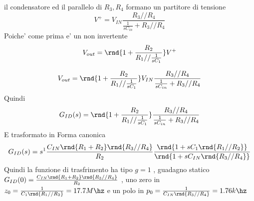 \documentclass[\main/main.tex]{subfiles}
\begin{document}
il condensatore ed il parallelo di $R_3,R_4$ formano un partitore di tensione
\[V^+ = V_{IN} \frac{R_3 // R_4}{\frac{1}{sC_{in}} + R_3 // R_4}\]
Poiche' come prima e' un non invertente
\[V_{out} = \rnd{1 + \frac{R_2}{R_1 // \frac{1}{sC_1}}}V^+\]

\[V_{out} = \rnd{1 + \frac{R_2}{R_1 // \frac{1}{sC_1}}}V_{IN} \frac{R_3 // R_4}{\frac{1}{sC_{in}} + R_3 // R_4}\]
Quindi
\[G_{ID}(s) =  \rnd{1 + \frac{R_2}{R_1 // \frac{1}{sC_1}}} \frac{R_3 // R_4}{\frac{1}{sC_{in}} + R_3 // R_4}\]
E trasformato in Forma canonica
\[G_{ID}(s) = s^1 \frac{C_{IN}\rnd{R_1 + R_2}\rnd{R_3 // R_4}}{R_2} \frac{\rnd{1 + s C_1 \rnd{R_1 // R_2}}}{\rnd{1 + s C_{IN}\rnd{R_3 // R_4}}}\]
Quindi la funzione di trasfrimento ha tipo $g = 1$ , guadagno statico $G_{ID}(0) = \frac{C_{IN}\rnd{R_1 + R_2}\rnd{R_3 // R_4}}{R_2}$ , uno zero in $z_0 = \frac{1}{ C_1 \rnd{R_1 // R_2}} = 17.7M\hz$ e un polo in $p_0 = \frac{1}{ C_{IN}\rnd{R_3 // R_4}} = 1.76k\hz$

\begin{center}
\end{center}
\end{document}
